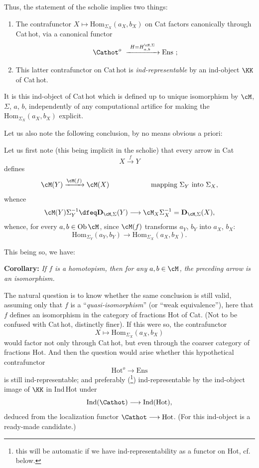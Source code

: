 Thus, the statement of the scholie implies two things:

\begin{enumerate}
\item[a)] The contrafunctor $X\longmapsto\mathrm{Hom}_{\Sigma_X}(a_X,b_X)$ on Cat factors canonically through Cat\,hot, via a canonical functor
\[
\Cathot^{o}\ \xrightarrow{\ H=H^{\cM,\Sigma}_{a,b}\ }\mathrm{Ens}\ ;
\]
\item[b)] This latter contrafunctor on Cat\,hot is \textit{ind-representable} by an ind-object $\KK$ of Cat\,hot.
\end{enumerate}

It is this ind-object of Cat\,hot which is defined up to unique isomorphism by $\cM$, $\Sigma$, $a$, $b$, independently of any computational artifice for making the $\mathrm{Hom}_{\Sigma_X}(a_X,b_X)$ explicit.

Let us also note the following conclusion, by no means obvious a priori:

Let us first note (this being implicit in the scholie) that every arrow in Cat
\[
X\xrightarrow{\ f\ }Y
\]
defines
\[
\cM(Y)\xrightarrow{\cM(f)}\cM(X) \qquad\qquad\qquad \text{mapping } \Sigma_Y \text{ into } \Sigma_X,
\]
whence
\[
\cM(Y)\Sigma_Y^{-1}\dfeq\mathbf{D}_{\cM,\Sigma}(Y)\longrightarrow\cM_X\Sigma_X^{-1}=\mathbf{D}_{\cM,\Sigma}(X),
\]
 whence, for every $a,b\in\mathrm{Ob}\,\cM$, since $\cM(f)$ transforms $a_Y$, $b_Y$ into $a_X$, $b_X$:
\[
\boxed{\mathrm{Hom}_{\Sigma_Y}(a_Y,b_Y)\longrightarrow\mathrm{Hom}_{\Sigma_X}(a_X,b_X).}
\]

This being so, we have:

\textbf{Corollary:} \textit{If $f$ is a homotopism, then for any $a,b\in\cM$, the preceding arrow is an isomorphism.} %

The natural question is to know whether the same conclusion is still valid, assuming only that $f$ is a ``\textit{quasi-isomorphism}'' (or ``weak equivalence''), here that $f$ defines an isomorphism in the category of fractions Hot of Cat. (Not to be confused with Cat\,hot,
distinctly finer). If this were so, the contrafunctor
\[
X\longmapsto\mathrm{Hom}_{\Sigma_X}(a_X,b_X)
\]
would factor not only through Cat\,hot, but even through the coarser category of fractions Hot. And then the question would arise whether this hypothetical contrafunctor
\[
\mathrm{Hot}^{o}\longrightarrow\mathrm{Ens}
\]
is still ind-representable; and preferably (\footnote[5]{this will be automatic if we have ind-representability as a functor on Hot, cf. below.}) ind-representable by the ind-object image of $\KK$ in Ind\,Hot under
\[
\mathrm{Ind}(\Cathot)\longrightarrow\mathrm{Ind}(\mathrm{Hot}),
\]
deduced from the localization functor $\Cathot\longrightarrow\mathrm{Hot}$. (For this ind-object is a ready-made candidate.)

